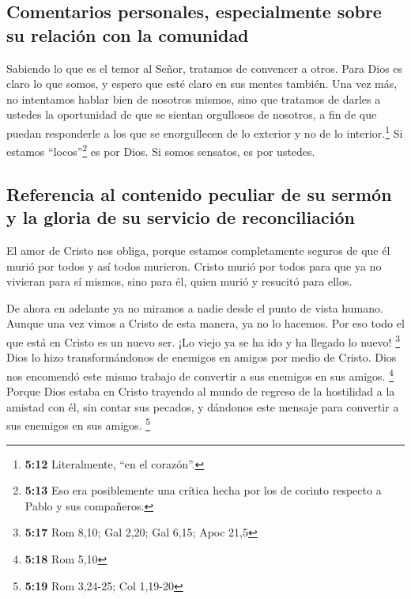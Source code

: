 \hypertarget{comentarios-personales-especialmente-sobre-su-relaciuxf3n-con-la-comunidad}{%
\subsection{Comentarios personales, especialmente sobre su relación con
la
comunidad}\label{comentarios-personales-especialmente-sobre-su-relaciuxf3n-con-la-comunidad}}

 Sabiendo lo que es el temor al Señor, tratamos de
convencer a otros. Para Dios es claro lo que somos, y espero que esté
claro en sus mentes también.  Una vez más, no intentamos
hablar bien de nosotros mismos, sino que tratamos de darles a ustedes la
oportunidad de que se sientan orgullosos de nosotros, a fin de que
puedan responderle a los que se enorgullecen de lo exterior y no de lo
interior.\footnote{\textbf{5:12} Literalmente, ``en el corazón''.}
 Si estamos ``locos''\footnote{\textbf{5:13} Eso era
  posiblemente una crítica hecha por los de corinto respecto a Pablo y
  sus compañeros.} es por Dios. Si somos sensatos, es por ustedes.

\hypertarget{referencia-al-contenido-peculiar-de-su-sermuxf3n-y-la-gloria-de-su-servicio-de-reconciliaciuxf3n}{%
\subsection{Referencia al contenido peculiar de su sermón y la gloria de
su servicio de
reconciliación}\label{referencia-al-contenido-peculiar-de-su-sermuxf3n-y-la-gloria-de-su-servicio-de-reconciliaciuxf3n}}

 El amor de Cristo nos obliga, porque estamos
completamente seguros de que él murió por todos y así todos murieron.
 Cristo murió por todos para que ya no vivieran para sí
mismos, sino para él, quien murió y resucitó para ellos.

 De ahora en adelante ya no miramos a nadie desde el
punto de vista humano. Aunque una vez vimos a Cristo de esta manera, ya
no lo hacemos.  Por eso todo el que está en Cristo es un
nuevo ser. ¡Lo viejo ya se ha ido y ha llegado lo nuevo! \footnote{\textbf{5:17}
  Rom 8,10; Gal 2,20; Gal 6,15; Apoc 21,5}  Dios lo hizo
transformándonos de enemigos en amigos por medio de Cristo. Dios nos
encomendó este mismo trabajo de convertir a sus enemigos en sus amigos.
\footnote{\textbf{5:18} Rom 5,10}  Porque Dios estaba en
Cristo trayendo al mundo de regreso de la hostilidad a la amistad con
él, sin contar sus pecados, y dándonos este mensaje para convertir a sus
enemigos en sus amigos. \footnote{\textbf{5:19} Rom 3,24-25; Col 1,19-20}

